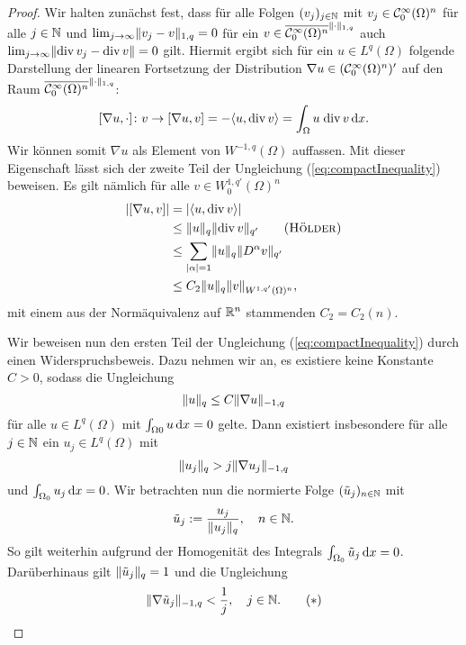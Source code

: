 \begin{proof}
  Wir halten zunächst fest, dass für alle Folgen $(v_j)_{j \in \mathbb{N}}$ mit $v_j \in \mathcal{C}_0^\infty(\Omega)^n$ für alle $j \in \mathbb{N}$ und $\lim_{j \to \infty} \lVert v_j - v \rVert_{1,q} = 0$ für ein $v \in \overline{\mathcal{C}_0^\infty(\Omega)^n}^{\lVert \cdot \rVert_{1,q}}$ auch $\lim_{j \to \infty} \lVert \mathrm{div\,} v_j - \mathrm{div\,} v \rVert = 0$ gilt.  
  Hiermit ergibt sich für ein $u \in L^q(\Omega)$ folgende Darstellung der linearen Fortsetzung der Distribution $\nabla u \in (\mathcal{C}_0^\infty(\Omega)^n)'$ auf den Raum $\overline{\mathcal{C}_0^\infty(\Omega)^n}^{\lVert \cdot \rVert_{1,q}}$:
  $$
    [\nabla u, \cdot] \colon v \to [\nabla u, v] 
    = - \langle u, \mathrm{div\,} v \rangle 
    = \int_{\Omega} u\; \mathrm{div\,} v \, {\operatorname{d}\!{x}}.
  $$
  Wir können somit $\nabla u$ als Element von $W^{-1,q}(\Omega)$ auffassen.
  Mit dieser Eigenschaft lässt sich der zweite Teil der Ungleichung (\ref{eq:compactInequality}) beweisen. 
  Es gilt nämlich für alle $v \in W_0^{1,q'}(\Omega)^n$
  \begin{align*}
    |[\nabla u, v]|
    &= | \langle u, \div v \rangle| \\
    &\leq \norm{u}_q \norm{\div v}_{q'} \tag{\hoelder}\\
    &\leq \sum_{|\alpha| = 1} \norm{u}_q \norm{D^\alpha v}_{q'} \\
    &\leq C_2 \norm{u}_q \norm{v}_{W^{1,q'}(\Omega)^n},
  \end{align*}
  mit einem aus der Normäquivalenz auf $\mathbb{R}^n$ stammenden $C_2 = C_2(n)$.

  Wir beweisen nun den ersten Teil der Ungleichung (\ref{eq:compactInequality}) durch einen Widerspruchsbeweis.
  Dazu nehmen wir an, es existiere keine Konstante $C > 0$, sodass die Ungleichung
  $$
  \lVert u \rVert_q \leq C \lVert \nabla u \rVert_{-1,q}
  $$
  für alle $u \in L^q(\Omega)$ mit $\int_{\Omega0} u \, {\operatorname{d}\!{x}} = 0$ gelte.
  Dann existiert insbesondere für alle $j \in \mathbb{N}$ ein $u_j \in L^q(\Omega)$ mit
  $$
  \lVert u_j \rVert_q > j \lVert \nabla u_j \rVert_{-1,q}
  $$
  und $\int_{\Omega_0} u_j \, {\operatorname{d}\!{x}} = 0$.
  Wir betrachten nun die normierte Folge $(\tilde u_j)_{n \in \mathbb{N}}$ mit 
  $$
  \tilde u_j := \frac{u_j}{\lVert u_j \rVert_{q}}, \quad n \in \mathbb{N}.
  $$
  So gilt weiterhin aufgrund der Homogenität des Integrals $\int_{\Omega_0} \tilde u_j \, {\operatorname{d}\!{x}} = 0$. 
  Darüberhinaus gilt $\lVert \tilde u_j \rVert_q = 1$ und die Ungleichung 
  \begin{displaymath}
    \lVert \nabla \tilde u_j \rVert_{-1,q} < \frac{1}{j}, \quad j \in \mathbb{N}. \tag{$\ast$}
  \end{displaymath}


\end{proof}
